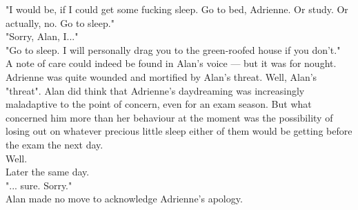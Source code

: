 "I would be, if I could get some fucking sleep. Go to bed, Adrienne. Or study. Or actually, no. Go to sleep."\\

"Sorry, Alan, I..."\\

"Go to sleep. I will personally drag you to the green-roofed house if you don't."\\

A note of care could indeed be found in Alan's voice --- but it was for nought. Adrienne was quite wounded and mortified by Alan's threat.
Well, Alan's "threat". Alan did think that Adrienne's daydreaming was increasingly maladaptive to the point of concern, even for an exam season.
But what concerned him more than her behaviour at the moment was the possibility of losing out on whatever precious little sleep either of them would be getting before the exam the next day.\\

Well.\\

Later the same day.\\

"... sure. Sorry."\\

Alan made no move to acknowledge Adrienne's apology.